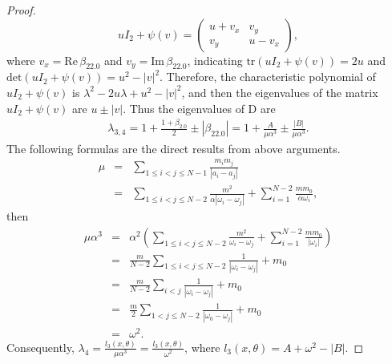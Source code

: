 \documentclass[11pt]{article}
\begin{document}
\begin{proof}
\begin{displaymath}
 uI_2+\psi(v)=\left(\begin{array}{cc}
 u+v_x&v_y\\
 v_y&u-v_x
 \end{array}
 \right),
 \end{displaymath}
 where $v_x=\text{Re}\,\beta_{22.0}$ and $ v_y=\text{Im}\,\beta_{22.0}$, indicating
 $\text{tr}(uI_2+\psi(v))=2u$ and $\text{det}(uI_2+\psi(v))=u^2-|v|^2$. 
 Therefore, the characteristic polynomial  of $uI_2+\psi(v)$ is $\lambda^2-2u\lambda+u^2-|v|^2$,
 and then the eigenvalues of the matrix $uI_2+\psi(v)$ are $u\pm|v|$. 
 Thus the eigenvalues of D are
 \begin{eqnarray*}
 	\lambda_{3,4}=1+\frac{1+\beta_{2.0}}{2}\pm|\beta_{22.0}|=1+\frac{A}{\mu\alpha^3}\pm\frac{|B|}{\mu\alpha^3}.
 \end{eqnarray*}
 The following formulas are the direct results from above arguments.
 \begin{eqnarray*}
 	\mu&=&\sum_{1\leq i<j\leq N-1}\frac{m_im_j}{|a_i-a_j|}\\
 	&=&\sum_{1\leq i<j\leq N-2}\frac{m^2}{\alpha|\omega_i-\omega_j|}+\sum_{i=1}^{N-2}\frac{mm_0}{\alpha\omega_i},
 \end{eqnarray*}
 then
 \begin{eqnarray*}
 	\mu\alpha^3&=&\alpha^2(\sum_{1\leq i<j\leq N-2}\frac{m^2}{\omega_i-\omega_j}+\sum_{i=1}^{N-2}\frac{mm_0}{|\omega_i|})
 	\\&=&\frac{m}{N-2}\sum_{1\leq i<j\leq N-2 }\frac{1}{|\omega_i-\omega_j|}+m_0
 	\\&=&\frac{m}{N-2}\sum_{i<j}\frac{1}{|\omega_i-\omega_j|}+m_0
 	\\&=&\frac{m}{2}\sum_{1<j\leq N-2}\frac{1}{|\omega_0-\omega_j|}+m_0
 	\\&=&\omega ^2.
 \end{eqnarray*}
 Consequently, $\lambda_4=\frac{l_3(x,\theta)}{\mu\alpha^3}
 =\frac{l_3(x,\theta)}{\omega^2}$, where $l_3(x,\theta)=A+\omega^2-|B|$.
\end{proof}
\end{document}
